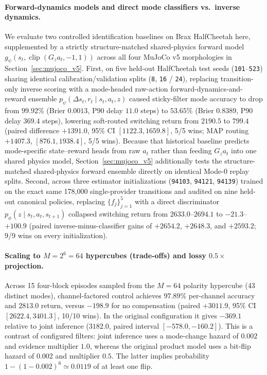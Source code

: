 \documentclass[twoside,11pt]{article}
\newcommand{\gain}{G}
\newcommand{\clip}{\operatorname{clip}}
\begin{document}
\paragraph{Forward-dynamics models and direct mode classifiers vs.\ inverse dynamics.}
We evaluate two controlled identification baselines on Brax HalfCheetah here, supplemented by a strictly structure-matched shared-physics forward model $g_\psi(s_t,\clip(\gain_z a_t,-1,1))$ across all four MuJoCo v5 morphologies in Section~\ref{sec:mujoco_v5}. First, on five held-out HalfCheetah test seeds (\texttt{101}--\texttt{523}) sharing identical calibration/validation splits (\texttt{8}, \texttt{16} / \texttt{24}), replacing transition-only inverse scoring with a mode-headed raw-action forward-dynamics-and-reward ensemble $p_\psi(\Delta s_t,r_t\mid s_t,a_t,z)$ caused sticky-filter mode accuracy to drop from $99.92\%$ (Brier $0.0013$, P90 delay $11.0$ steps) to $53.65\%$ (Brier $0.8389$, P90 delay $369.4$ steps), lowering soft-routed switching return from $2190.5$ to $799.4$ (paired difference $+1391.0$, 95\% CI $[1122.3,1659.8]$, 5/5 wins; MAP routing $+1407.3$, $[876.1,1938.4]$, 5/5 wins). Because that historical baseline predicts mode-specific state--reward heads from raw $a_t$ rather than feeding $\gain_z a_t$ into one shared physics model, Section~\ref{sec:mujoco_v5} additionally tests the structure-matched shared-physics forward ensemble directly on identical Mode-0 replay splits. Second, across three estimator initializations (\texttt{94103}, \texttt{94121}, \texttt{94139}) trained on the exact same 178,000 single-provider transitions and audited on nine held-out canonical policies, replacing $\{f_j\}_{j=1}^5$ with a direct discriminator $p_\phi(z\mid s_t,a_t,s_{t+1})$ collapsed switching return from $2633.0$--$2694.1$ to $-21.3$--$+100.9$ (paired inverse-minus-classifier gains of $+2654.2$, $+2648.3$, and $+2593.2$; 9/9 wins on every initialization).

\paragraph{Scaling to $M=2^6=64$ hypercubes (trade-offs) and lossy $0.5\times$ projection.}
Across 15 four-block episodes sampled from the $M=64$ polarity hypercube (43 distinct modes), channel-factored control achieves $97.89\%$ per-channel accuracy and $2813.0$ return, versus $-198.9$ for no compensation (paired $+3011.9$, 95\% CI $[2622.4,3401.3]$, 10/10 wins). In the original configuration it gives $-369.1$ relative to joint inference ($3182.0$, paired interval $[-578.0,-160.2]$). This is a contrast of configured filters: joint inference uses a mode-change hazard of $0.002$ and evidence multiplier $1.0$, whereas the original product model uses a bit-flip hazard of $0.002$ and multiplier $0.5$. The latter implies probability $1-(1-0.002)^6 \simeq 0.0119$ of at least one flip.
\end{document}
